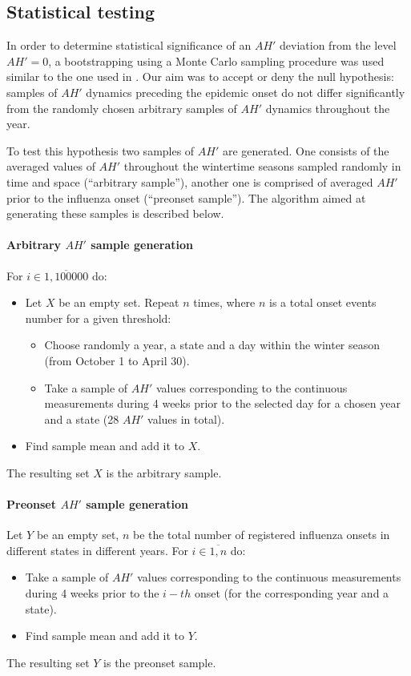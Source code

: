 \documentclass[3p,times,procedia]{elsarticle}
\begin{document}
\subsection{Statistical testing}
\label{sect:stats}
In order to determine statistical significance of an $AH'$ deviation from the level $AH' = 0$, a bootstrapping using a Monte Carlo sampling procedure was used similar to the one used in \cite{shaman2010absolute}. Our aim was to accept or deny the null hypothesis: samples of $AH'$ dynamics preceding the epidemic onset do not differ significantly from the randomly chosen arbitrary samples of $AH'$ dynamics throughout the year.

To test this hypothesis two samples of $AH'$ are generated. One consists of the averaged values of $AH'$ throughout the wintertime seasons sampled randomly in time and space (``arbitrary sample''), another one is comprised of averaged $AH'$ prior to the influenza onset (``preonset sample''). The algorithm aimed at generating these samples is described below.

\paragraph{Arbitrary $AH'$ sample generation}
For $i \in \overline{1,100000}$ do:
\begin{itemize}
	\item Let $X$ be an empty set.
		Repeat $n$ times, where $n$ is a total onset events number for a given threshold:
	\begin{itemize}
		\item Choose randomly a year, a state and a day within the winter season (from October 1 to April 30).
		\item Take a sample of $AH'$ values corresponding to the continuous measurements during 4 weeks prior to the selected day for a chosen year and a state (28 $AH'$ values in total).
	\end{itemize}
	\item Find sample mean and add it to $X$.
\end{itemize}
The resulting set $X$ is the arbitrary sample.

\paragraph{Preonset $AH'$ sample generation}
Let $Y$ be an empty set, $n$ be the total number of registered influenza onsets in different states in different years. For $i \in \overline{1,n}$ do:
\begin{itemize}
	\item Take a sample of $AH'$ values corresponding to the continuous measurements during 4 weeks prior to the $i-th$ onset (for the corresponding year and a state).
	\item Find sample mean and add it to $Y$.
\end{itemize}
The resulting set $Y$ is the preonset sample.
\end{document}
